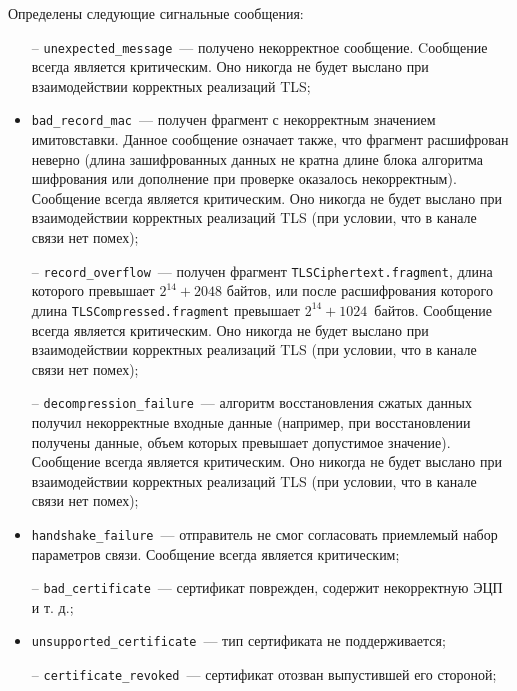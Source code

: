 Определены следующие сигнальные сообщения:
\begin{itemize}
\item[--]
\lstinline{unexpected_message}~--- получено некорректное сообщение. 
Cообщение всегда является критическим. Оно никогда не будет выслано при 
взаимодействии корректных реализаций TLS; 

\item[--]
\lstinline{bad_record_mac}~--- получен фрагмент с некорректным 
значением имитовставки. Данное сообщение означает также, что фрагмент 
расшифрован неверно (длина зашифрованных данных не кратна длине блока 
алгоритма шифрования или дополнение при проверке оказалось некорректным). 
Сообщение всегда является критическим. Оно никогда не будет выслано при 
взаимодействии корректных реализаций TLS (при условии, что в канале связи 
нет помех); 

\item[--]
\lstinline{record_overflow}~--- получен фрагмент 
\lstinline{TLSCiphertext.fragment}, длина которого превышает $2^{14} + 2048$ 
байтов, или после расшифрования которого длина 
\lstinline{TLSCompressed.fragment} превышает $2^{14} + 1024$~байтов. 
Сообщение всегда является критическим. Оно никогда не будет выслано при 
взаимодействии корректных реализаций TLS (при условии, что в канале связи 
нет помех);  

\item[--]
\lstinline{decompression_failure}~--- алгоритм восстановления сжатых 
данных получил некорректные входные данные (например, при восстановлении 
получены данные, объем которых превышает допустимое значение). Сообщение 
всегда является критическим. Оно никогда не будет выслано при 
взаимодействии корректных реализаций TLS (при условии, что в канале связи 
нет помех); 

\item[--]
\lstinline{handshake_failure}~--- отправитель не смог согласовать 
приемлемый набор параметров связи. Сообщение всегда является критическим; 

\item[--]
\lstinline{bad_certificate}~--- сертификат поврежден, содержит 
некорректную ЭЦП и т. д.; 

\item[--]
\lstinline{unsupported_certificate}~--- тип сертификата не 
поддерживается; 

\item[--]
\lstinline{certificate_revoked}~--- сертификат отозван выпустившей 
его стороной; 


\end{itemize}
